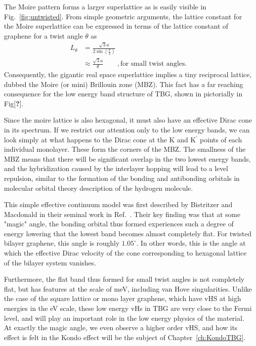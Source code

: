 The Moire pattern forms a larger superlattice as is easily visible in Fig.~\ref{fig:untwisted}. From simple geometric arguments, the lattice constant for the Moire superlattice can be expressed in terms of the lattice constant of graphene for a twist angle $\theta$ as~\cite{Bistritzer2011}
\begin{align}
    L_\theta &= \frac{\sqrt{3}a}{2\sin\left(\frac{\theta}{2}\right)}\, \nonumber  \\
    &\approx \frac{\sqrt{3}a}{\theta} \quad\quad, \text{for small twist angles.}
\end{align}
Consequently, the gigantic real space superlattice implies a tiny reciprocal lattice, dubbed the Moire (or mini) Brillouin zone (MBZ).  
This fact has a far reaching consequence for the low energy band structure of TBG, shown in pictorially in Fig[\textbf{?}]. 
\par
Since the moire lattice is also hexagonal, it must also have an effective Dirac cone in its spectrum. 
If we restrict our attention only to the low energy bands, we can look simply at what happens to the Dirac cone at the K and K${}^\prime$ points of each individual monolayer. These form the corners of the MBZ. The smallness of the MBZ means that there will be significant overlap in the two lowest energy bands, and the hybridization caused by the interlayer hopping will lead to a level repulsion, similar to the formation of the bonding and antibonding orbitals in molecular orbital theory description of the hydrogen molecule.
\par
This simple effective continuum model was first described by Bistritzer and Macdonald in their seminal work in Ref.~\cite{Bistritzer2011}. Their key finding was that at some "magic" angle, the bonding orbital thus formed experiences such a degree of energy lowering that the lowest band becomes almost completely flat. For twisted bilayer graphene, this angle is roughly $1.05^\circ$. In other words, this is the angle at which the effective Dirac velocity of the cone corresponding to hexagonal lattice of the bilayer system vanishes. 
\par
Furthermore, the flat band thus formed for small twist angles is not completely flat, but has features at the scale of meV, including van Hove singularities. Unlike the case of the square lattice or mono layer graphene, which have vHS at high energies in the eV scale, these low energy vHs in TBG are very close to the Fermi level, and will play an important role in the low energy physics of the material. At exactly the magic angle, we even observe a higher order vHS, and how its effect is felt in the Kondo effect will be the subject of Chapter~\ref{ch:KondoTBG}.

















